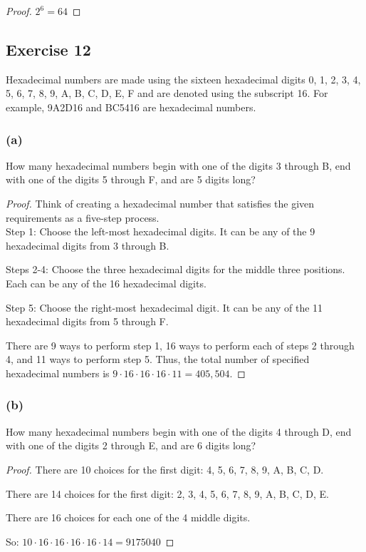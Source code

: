 \documentclass[14pt]{extarticle}
\newcommand{\cy}{\color{cyan}}
\begin{document}
\begin{proof}
\(2^6 = 64\)
\end{proof}

\subsection{Exercise 12}
Hexadecimal numbers are made using the sixteen hexadecimal digits 0, 1, 2, 3, 4, 5, 6, 7, 8, 9, A, B, C, D, E, F and 
are denoted using the subscript 16. For example, 9A2D16 and BC5416 are hexadecimal numbers.

\subsubsection{(a)}
How many hexadecimal numbers begin with one of the digits 3 through B, end with one of the digits 5 through F, and are 
5 digits long?

\begin{proof}
Think of creating a hexadecimal number that satisfies the given requirements as a five-step process. \\
{\cy Step 1:} Choose the left-most hexadecimal digits. It can be any of the 9 hexadecimal digits from 3 through B.

{\cy Steps 2-4:} Choose the three hexadecimal digits for the middle three positions. Each can be any of the 16 
hexadecimal digits.

{\cy Step 5:} Choose the right-most hexadecimal digit. It can be any of the 11 hexadecimal digits from 5 through F.

There are 9 ways to perform step 1, 16 ways to perform each of steps 2 through 4, and 11 ways to perform step 5. Thus, 
the total number of specified hexadecimal numbers is \(9 \cdot 16 \cdot 16 \cdot 16 \cdot 11 = 405,504\).
\end{proof}

\subsubsection{(b)}
How many hexadecimal numbers begin with one of the digits 4 through D, end with one of the digits 2 through E, and are 
6 digits long?

\begin{proof}
There are 10 choices for the first digit: 4, 5, 6, 7, 8, 9, A, B, C, D.

There are 14 choices for the first digit: 2, 3, 4, 5, 6, 7, 8, 9, A, B, C, D, E.

There are 16 choices for each one of the 4 middle digits.

So: \(10 \cdot 16 \cdot 16 \cdot 16 \cdot 16 \cdot 14 = 9175040\)
\end{proof}
\end{document}
